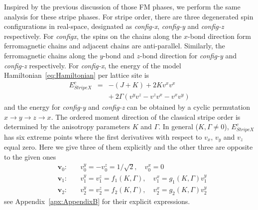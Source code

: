 \documentclass[aps,prb,reprint,amsfonts,amsmath,amssymb,showpacs,groupedaddress,superscriptaddress]{revtex4-1}
\begin{document}
Inspired by the previous discussion of those FM phases, we perform the same analysis for these stripe phases. For stripe order, there are three degenerated spin configurations in real-space, designated as \emph{config-x}, \emph{config-y} and \emph{config-z} respectively. For \emph{configx}, the spins on the chains along the $x$-bond direction form ferromagnetic chains and adjacent chains are anti-parallel. Similarly, the ferromagnetic chains along the $y$-bond and $z$-bond direction for \emph{config-y} and \emph{config-z} respectively. For \emph{config-x}, the energy of the model Hamiltonian~\eqref{eq:Hamiltonian} per lattice site is
\begin{eqnarray}
    E_{StripeX}^{c} & = & -(J + K) + 2 K v^x v^x \nonumber \\
        & & +\: 2 \Gamma (v^y v^z - v^z v^x - v^x v^y)
        \label{eq:EcStripeX}
\end{eqnarray}
and the energy for \emph{config-y} and \emph{config-z} can be obtained by a cyclic permutation $x \rightarrow y \rightarrow z \rightarrow x$. The ordered moment direction of the classical stripe order is determined by the anisotropy parameters $K$ and $\Gamma$. In general ($K,\Gamma \neq 0$), $E_{StripeX}^{c}$ has six extreme points where the first derivatives with respect to $v_x$, $v_y$ and $v_z$ equal zero. Here we give three of them explicitly and the other three are opposite to the given ones
\begin{subequations}
    \label{eq:whole}
    \begin{eqnarray}
        & \bm{v}_0:& \quad v_{0}^{y}=-v_{0}^{z} = 1/\sqrt{2}, \quad v_{0}^{x} = 0 \label{eq:v0} \\
        & \bm{v}_1:& \quad v_{1}^{y}=v_{1}^{z} = f_{1}(K, \Gamma), \quad v_{1}^{x} = g_{1}(K, \Gamma) v_{1}^{y} \label{eq:v1} \\
        & \bm{v}_2:& \quad v_{2}^{y}=v_{2}^{z} = f_{2}(K, \Gamma), \quad v_{2}^{x} = g_{2}(K, \Gamma) v_{2}^{y} \label{eq:v2}
    \end{eqnarray}
\end{subequations}
see Appendix~\ref{apx:AppendixB} for their explicit expressions.
\end{document}
